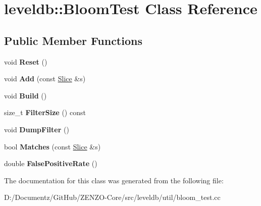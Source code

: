 \hypertarget{classleveldb_1_1_bloom_test}{}\section{leveldb\+::Bloom\+Test Class Reference}
\label{classleveldb_1_1_bloom_test}
\subsection*{Public Member Functions}
\begin{DoxyCompactItemize}
\item 
\mbox{\label{classleveldb_1_1_bloom_test_a067ba6753890a5a924edd7efaad7187a}} 
void {\bfseries Reset} ()
\item 
\mbox{\label{classleveldb_1_1_bloom_test_a2f7777014cec7c35f85373e2832bfd88}} 
void {\bfseries Add} (const \mbox{\hyperlink{classleveldb_1_1_slice}{Slice}} \&s)
\item 
\mbox{\label{classleveldb_1_1_bloom_test_ad4fc802152c68599c919d33917523d31}} 
void {\bfseries Build} ()
\item 
\mbox{\label{classleveldb_1_1_bloom_test_a10dfa3fd52a26dcc5045320d44e55ee4}} 
size\+\_\+t {\bfseries Filter\+Size} () const
\item 
\mbox{\label{classleveldb_1_1_bloom_test_a6f210bc2f2e69c0aeb570fa4dbe4d0da}} 
void {\bfseries Dump\+Filter} ()
\item 
\mbox{\label{classleveldb_1_1_bloom_test_a1d2a9794bd26ac0124a18511689ef211}} 
bool {\bfseries Matches} (const \mbox{\hyperlink{classleveldb_1_1_slice}{Slice}} \&s)
\item 
\mbox{\label{classleveldb_1_1_bloom_test_abf887498db753825b308933df22c0bbb}} 
double {\bfseries False\+Positive\+Rate} ()
\end{DoxyCompactItemize}


The documentation for this class was generated from the following file\+:\begin{DoxyCompactItemize}
\item 
D\+:/\+Documentz/\+Git\+Hub/\+Z\+E\+N\+Z\+O-\/\+Core/src/leveldb/util/bloom\+\_\+test.\+cc\end{DoxyCompactItemize}
